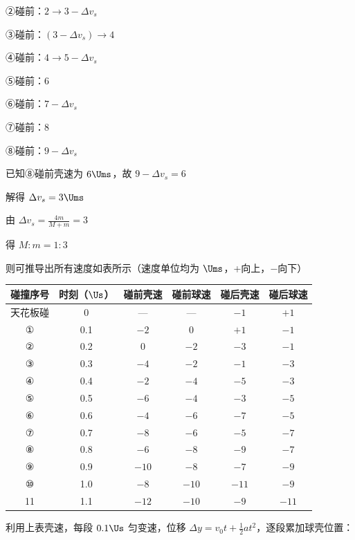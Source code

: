 \documentclass[\gkver]{gaokaozhenti}
\begin{document}
\begin{enumerate}
{②碰前：$2\rightarrow3-\Delta v_{s}$

③碰前：$(3-\Delta v_{s})\rightarrow4$

④碰前：$4\rightarrow5-\Delta v_{s}$

⑤碰前：6

⑥碰前：$7-\Delta v_{s}$

⑦碰前：8

⑧碰前：$9-\Delta v_{s}$

已知⑧碰前壳速为 $6\Ums$，故 $9-\Delta v_{s}=6$

解得 $\Delta v_{s}=3\Ums$

由 $\Delta v_{s}=\frac{4m}{M+m}=3$

得 $M:m=1:3$

则可推导出所有速度如表所示（速度单位均为 $\Ums$，+向上，$-$向下）

\begin{center}
\begin{tabular}{|c|c|c|c|c|c|}
\hline
碰撞序号 & 时刻（$\Us$） & 碰前壳速 & 碰前球速 & 碰后壳速 & 碰后球速 \\
\hline
天花板碰 & 0 & --- & --- & $-1$ & $+1$ \\
\hline
① & 0.1 & $-2$ & 0 & $+1$ & $-1$ \\
\hline
② & 0.2 & 0 & $-2$ & $-3$ & $-1$ \\
\hline
③ & 0.3 & $-4$ & $-2$ & $-1$ & $-3$ \\
\hline
④ & 0.4 & $-2$ & $-4$ & $-5$ & $-3$ \\
\hline
⑤ & 0.5 & $-6$ & $-4$ & $-3$ & $-5$ \\
\hline
⑥ & 0.6 & $-4$ & $-6$ & $-7$ & $-5$ \\
\hline
⑦ & 0.7 & $-8$ & $-6$ & $-5$ & $-7$ \\
\hline
⑧ & 0.8 & $-6$ & $-8$ & $-9$ & $-7$ \\
\hline
⑨ & 0.9 & $-10$ & $-8$ & $-7$ & $-9$ \\
\hline
⑩ & 1.0 & $-8$ & $-10$ & $-11$ & $-9$ \\
\hline
11 & 1.1 & $-12$ & $-10$ & $-9$ & $-11$ \\
\hline
\end{tabular}
\end{center}

利用上表壳速，每段 $0.1\Us$ 匀变速，位移 $\Delta y=v_{0}t+\frac{1}{2}at^{2}$，逐段累加球壳位置：

}
\end{enumerate}
\end{document}
